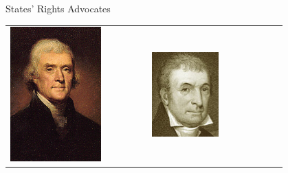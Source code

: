 \begin{frame}{States' Rights Advocates}
\begin{table}[h]
\centering
\begin{tabular}{lcccccc} 
    \includegraphics[width=0.75\textwidth,height=.3\textheight,keepaspectratio=true]{img/jefferson.png} &
    \includegraphics[width=0.75\textwidth,height=.3\textheight,keepaspectratio=true]{img/luther-martin.png} &

\end{tabular}
\end{table}
\end{frame}
